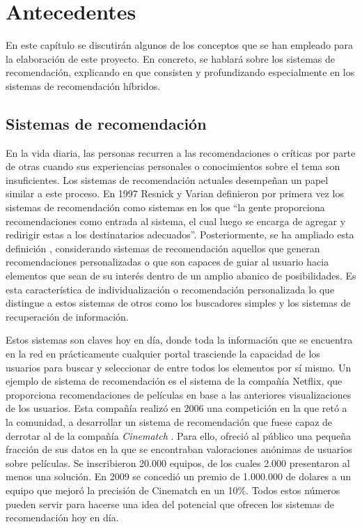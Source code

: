\chapter{Antecedentes}
\label{chap:antecedentes}

En este capítulo se discutirán algunos de los conceptos que se han empleado para la elaboración de este proyecto. En concreto, se hablará sobre los sistemas de recomendación, explicando en que consisten y profundizando especialmente en los sistemas de recomendación híbridos. 

\section{Sistemas de recomendación}
En la vida diaria, las personas recurren a las recomendaciones o críticas por parte de otras cuando sus experiencias personales o conocimientos sobre el tema son insuficientes.  Los sistemas de recomendación actuales desempeñan un papel similar a este proceso. En 1997 Resnick y Varian \cite{Resnick:1997:RS:245108.245121} definieron por primera vez los sistemas de recomendación como sistemas en los que ``la gente proporciona recomendaciones como entrada al sistema, el cual luego se encarga de agregar y redirigir estas a los destinatarios adecuados''. %
Posteriormente, se ha ampliado esta definición \cite{Burke}, considerando sistemas de recomendación aquellos que generan recomendaciones personalizadas o que son capaces de guiar al usuario hacia elementos que sean de su interés dentro de un amplio abanico de posibilidades. Es esta característica de individualización o recomendación personalizada lo que distingue a estos sistemas de otros como los buscadores simples y los sistemas de recuperación de información.

Estos sistemas son claves hoy en día, donde toda la información que se encuentra en la red en prácticamente cualquier portal trasciende la capacidad de los usuarios para buscar y seleccionar de entre todos los elementos por sí mismo. Un ejemplo de sistema de recomendación es el sistema de la compañía Netflix, que proporciona recomendaciones de películas en base a las anteriores visualizaciones de los usuarios. Esta compañía realizó en 2006 una competición en la que retó a la comunidad, a desarrollar un sistema de recomendación que fuese capaz de derrotar al de la compañía \textit{Cinematch} \cite{Bennett:2007}. Para ello, ofreció al público una pequeña fracción de sus datos en la que se encontraban valoraciones anónimas de usuarios sobre películas. Se inscribieron 20.000 equipos, de los cuales 2.000 presentaron al menos una solución. En 2009 se concedió un premio de 1.000.000 de dolares a un equipo que mejoró la precisión de Cinematch en un 10\%. Todos estos números pueden servir para hacerse una idea del potencial que ofrecen los sistemas de recomendación hoy en día.

